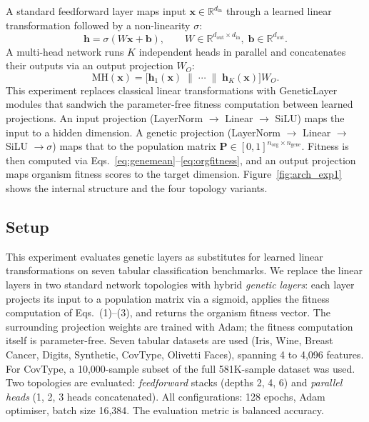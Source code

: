 \documentclass[10pt, a4paper, twocolumn]{article}
\begin{document}
A standard feedforward layer maps input $\mathbf{x}\in\mathbb{R}^{d_\mathrm{in}}$ through a learned linear transformation followed by a non-linearity $\sigma$:
%
\begin{equation*}
  \mathbf{h} = \sigma(W\mathbf{x} + \mathbf{b}), \qquad W\in\mathbb{R}^{d_\mathrm{out}\times d_\mathrm{in}},\;\mathbf{b}\in\mathbb{R}^{d_\mathrm{out}}.
\end{equation*}
%
A multi-head network runs $K$ independent heads in parallel and concatenates their outputs via an output projection $W_O$:
%
\begin{equation*}
  \mathrm{MH}(\mathbf{x}) = \bigl[\mathbf{h}_1(\mathbf{x})\;\|\;\cdots\;\|\;\mathbf{h}_K(\mathbf{x})\bigr]W_O.
\end{equation*}
%
This experiment replaces classical linear transformations with \textsf{GeneticLayer} modules that sandwich the parameter-free fitness computation between learned projections. An input projection (LayerNorm $\to$ Linear $\to$ SiLU) maps the input to a hidden dimension. A genetic projection (LayerNorm $\to$ Linear $\to$ SiLU $\to\sigma$) maps that to the population matrix $\mathbf{P}\in[0,1]^{n_\mathrm{org}\times n_\mathrm{gene}}$. Fitness is then computed via Eqs.~\eqref{eq:genemean}--\eqref{eq:orgfitness}, and an output projection maps organism fitness scores to the target dimension. Figure~\ref{fig:arch_exp1} shows the internal structure and the four topology variants.

\subsection*{Setup}

This experiment evaluates genetic layers as substitutes for learned linear transformations on seven tabular classification benchmarks. We replace the linear layers in two standard network topologies with hybrid \emph{genetic layers}: each layer projects its input to a population matrix via a sigmoid, applies the fitness computation of Eqs.~(1)--(3), and returns the organism fitness vector. The surrounding projection weights are trained with Adam; the fitness computation itself is parameter-free. Seven tabular datasets are used (Iris, Wine, Breast Cancer, Digits, Synthetic, CovType, Olivetti Faces), spanning 4 to 4,096 features. For CovType, a 10,000-sample subset of the full 581K-sample dataset was used. Two topologies are evaluated: \emph{feedforward} stacks (depths 2, 4, 6) and \emph{parallel heads} (1, 2, 3 heads concatenated). All configurations: 128 epochs, Adam optimiser, batch size 16,384. The evaluation metric is balanced accuracy.
\end{document}
